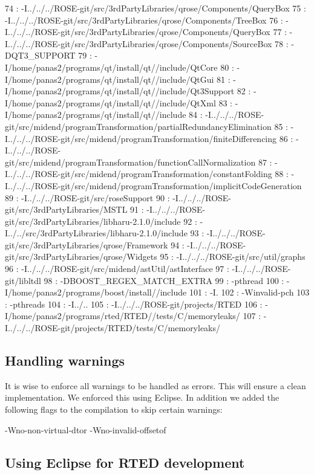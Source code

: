   74 : -I../../../ROSE-git/src/3rdPartyLibraries/qrose/Components/QueryBox
  75 : -I../../../ROSE-git/src/3rdPartyLibraries/qrose/Components/TreeBox
  76 : -I../../../ROSE-git/src/3rdPartyLibraries/qrose/Components/QueryBox
  77 : -I../../../ROSE-git/src/3rdPartyLibraries/qrose/Components/SourceBox
  78 : -DQT3\_SUPPORT
  79 : -I/home/panas2/programs/qt/install/qt//include/QtCore
  80 : -I/home/panas2/programs/qt/install/qt//include/QtGui
  81 : -I/home/panas2/programs/qt/install/qt//include/Qt3Support
  82 : -I/home/panas2/programs/qt/install/qt//include/QtXml
  83 : -I/home/panas2/programs/qt/install/qt//include
  84 : -I../../../ROSE-git/src/midend/programTransformation/partialRedundancyElimination
  85 : -I../../../ROSE-git/src/midend/programTransformation/finiteDifferencing
  86 : -I../../../ROSE-git/src/midend/programTransformation/functionCallNormalization
  87 : -I../../../ROSE-git/src/midend/programTransformation/constantFolding
  88 : -I../../../ROSE-git/src/midend/programTransformation/implicitCodeGeneration
  89 : -I../../../ROSE-git/src/roseSupport
  90 : -I../../../ROSE-git/src/3rdPartyLibraries/MSTL
  91 : -I../../../ROSE-git/src/3rdPartyLibraries/libharu-2.1.0/include
  92 : -I../../src/3rdPartyLibraries/libharu-2.1.0/include
  93 : -I../../../ROSE-git/src/3rdPartyLibraries/qrose/Framework
  94 : -I../../../ROSE-git/src/3rdPartyLibraries/qrose/Widgets
  95 : -I../../../ROSE-git/src/util/graphs
  96 : -I../../../ROSE-git/src/midend/astUtil/astInterface
  97 : -I../../../ROSE-git/libltdl
  98 : -DBOOST\_REGEX\_MATCH\_EXTRA
  99 : -pthread
  100 : -I/home/panas2/programs/boost/install//include
  101 : -I.
  102 : -Winvalid-pch
  103 : -pthreads
  104 : -I../..
  105 : -I../../../ROSE-git/projects/RTED
  106 : -I/home/panas2/programs/rted/RTED//tests/C/memoryleaks/
  107 : -I../../../ROSE-git/projects/RTED/tests/C/memoryleaks/

\subsection{Handling warnings}

It is wise to enforce all warnings to be handled as errors. This will ensure a clean implementation. We enforced this using Eclipse.
In addition we added the following flags to the compilation to skip certain warnings:

  -Wno-non-virtual-dtor -Wno-invalid-offsetof 

\subsection{Using Eclipse for RTED development}

